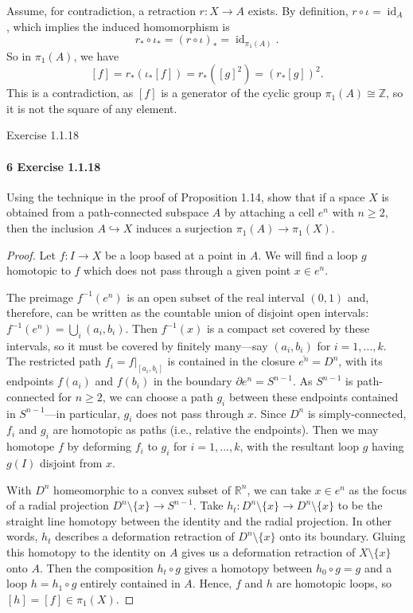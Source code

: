 \documentclass[12pt]{article}
\newlength{\myparskip}
\newenvironment{fullbox}{\begin{lrbox}{\savefullbox}\begin{minipage}{\dimexpr\textwidth-2\fboxsep\relax}\setlength{\parskip}{\myparskip}}{\end{minipage}\end{lrbox}\framebox[\textwidth]{\usebox{\savefullbox}}}
\newenvironment{pbox}[1][]{\begin{fullbox}\ifx#1\empty\else\paragraph{#1}\phantom{}\fi}{\end{fullbox}}
\theoremstyle{definition}
\newcommand{\Z}{\mathbb{Z}}
\newcommand{\R}{\mathbb{R}}
\newcommand{\<}{\langle}
\renewcommand{\>}{\rangle}
\newcommand{\isom}{\cong}
\newcommand{\clo}{\overline}
\DeclareMathOperator{\id}{id}
\newcommand{\inc}{\hookrightarrow}
\newcommand{\bd}{\partial}
\begin{document}
Assume, for contradiction, a retraction $r : X \to A$ exists.
By definition, $r \circ \iota = \id_A$, which implies the induced homomorphism is
\[
    r_* \circ \iota_* = (r \circ \iota)_* = \id_{\pi_1(A)}.
\]
So in $\pi_1(A)$, we have
\[
    [f]
        = r_*(\iota_*[f])
        = r_*([g]^2)
        = (r_*[g])^2.
\]
This is a contradiction, as $[f]$ is a generator of the cyclic group $\pi_1(A) \isom \Z$, so it is not the square of any element.

\begin{pbox}[6 Exercise 1.1.18]
    Using the technique in the proof of Proposition 1.14, show that if a space $X$ is obtained from a path-connected subspace $A$ by attaching a cell $e^n$ with $n \geq 2$, then the inclusion $A \inc X$ induces a surjection $\pi_1(A) \to \pi_1(X)$.
\end{pbox}

\begin{proof}
    Let $f : I \to X$ be a loop based at a point in $A$.
    We will find a loop $g$ homotopic to $f$ which does not pass through a given point $x \in e^n$.

    The preimage $f^{-1}(e^n)$ is an open subset of the real interval $(0, 1)$ and, therefore, can be written as the countable union of disjoint open intervals: $f^{-1}(e^n) = \bigcup_i (a_i, b_i)$.
    Then $f^{-1}(x)$ is a compact set covered by these intervals, so it must be covered by finitely many---say $(a_i, b_i)$ for $i = 1, \dots, k$.
    The restricted path $f_i = f|_{[a_i, b_i]}$ is contained in the closure $\clo{e^n} = D^n$, with its endpoints $f(a_i)$ and $f(b_i)$ in the boundary $\bd e^n = S^{n-1}$.
    As $S^{n-1}$ is path-connected for $n \geq 2$, we can choose a path $g_i$ between these endpoints contained in $S^{n-1}$---in particular, $g_i$ does not pass through $x$.
    Since $D^n$ is simply-connected, $f_i$ and $g_i$ are homotopic as paths (i.e., relative the endpoints).
    Then we may homotope $f$ by deforming $f_i$ to $g_i$ for $i = 1, \dots, k$, with the resultant loop $g$ having $g(I)$ disjoint from $x$.

    With $D^n$ homeomorphic to a convex subset of $\R^n$, we can take $x \in e^n$ as the focus of a radial projection $D^n \setminus \{x\} \to S^{n-1}$.
    Take $h_t : D^n \setminus \{x\} \to D^n \setminus \{x\}$ to be the straight line homotopy between the identity and the radial projection.
    In other words, $h_t$ describes a deformation retraction of $D^n \setminus \{x\}$ onto its boundary.
    Gluing this homotopy to the identity on $A$ gives us a deformation retraction of $X \setminus \{x\}$ onto $A$.
    Then the composition $h_t \circ g$ gives a homotopy between $h_0 \circ g = g$ and a loop $h = h_1 \circ g$ entirely contained in $A$.
    Hence, $f$ and $h$ are homotopic loops, so $[h] = [f] \in \pi_1(X)$. 
\end{proof}
\end{document}
